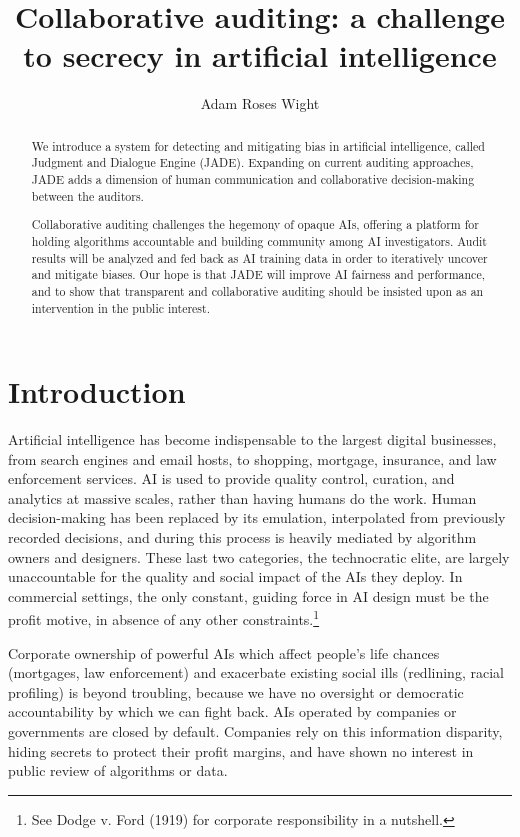\documentclass[format=sigconf]{acmart}
\title{Collaborative auditing: a challenge to secrecy in artificial intelligence}
\author{Adam Roses Wight}
\affiliation{Wikimedia Foundation}
\begin{document}
\begin{abstract}
We introduce a system for detecting and mitigating bias in artificial intelligence, called Judgment and Dialogue Engine (JADE).  Expanding on current auditing approaches, JADE adds a dimension of human communication and collaborative decision-making between the auditors.

Collaborative auditing challenges the hegemony of opaque AIs, offering a platform for holding algorithms accountable and building community among AI investigators.  Audit results will be analyzed and fed back as AI training data in order to iteratively uncover and mitigate biases.  Our hope is that JADE will improve AI fairness and performance, and to show that transparent and collaborative auditing should be insisted upon as an intervention in the public interest.
\end{abstract}

\maketitle

\section{Introduction}

Artificial intelligence has become indispensable to the largest digital businesses, from search engines and email hosts, to shopping, mortgage, insurance, and law enforcement services.  AI is used to provide quality control, curation, and analytics at massive scales, rather than having humans do the work.  Human decision-making has been replaced by its emulation, interpolated from previously recorded decisions, and during this process is heavily mediated by algorithm owners and designers.  These last two categories, the technocratic elite, are largely unaccountable for the quality and social impact of the AIs they deploy.  In commercial settings, the only constant, guiding force in AI design must be the profit motive, in absence of any other constraints.\footnote{See Dodge v. Ford (1919) for corporate responsibility in a nutshell.}

Corporate ownership of powerful AIs which affect people's life chances (mortgages, law enforcement) and exacerbate existing social ills (redlining, racial profiling) is beyond troubling, because we have no oversight or democratic accountability by which we can fight back.  AIs operated by companies or governments are closed by default.  Companies rely on this information disparity, hiding secrets to protect their profit margins, and have shown no interest in public review of algorithms or data.
\end{document}
